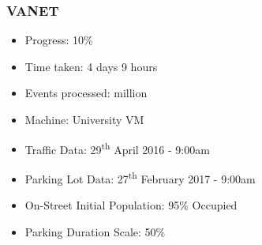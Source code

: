 \subsubsection{VANET}
\begin{itemize}
    \setlength\itemsep{0em}
    \item Progress: 10\%
    \item Time taken: 4 days 9 hours
    \item Events processed:  million
    \item Machine: University VM
    \item Traffic Data: 29\textsuperscript{th} April 2016 - 9:00am
    \item Parking Lot Data: 27\textsuperscript{th} February 2017 - 9:00am
    \item On-Street Initial Population: 95\% Occupied
    \item Parking Duration Scale: 50\%
\end{itemize}


